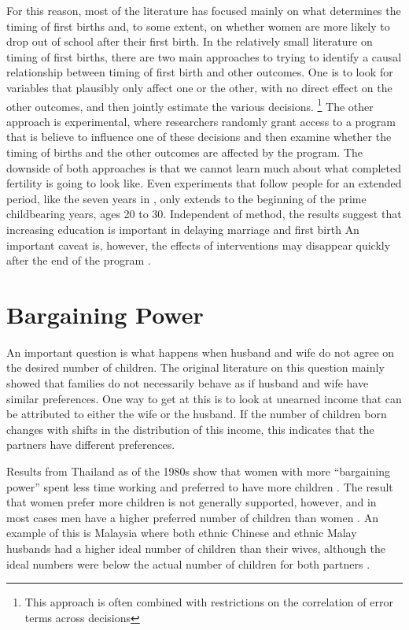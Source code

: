 \documentclass[letterpaper,12pt]{article}
\begin{document}
For this reason, most of the literature has focused mainly on what
determines the timing of first births and, to some extent, on whether
women are more likely to drop out of school after their first birth.
In the relatively small literature on timing of first births, there are
two main approaches to trying to identify a causal relationship between
timing of first birth and other outcomes.
One is to look for variables that plausibly only affect one or the
other, with no direct effect on the other outcomes, and then jointly
estimate the various decisions.%
\footnote{
This approach is often combined with restrictions on the correlation of
error terms across decisions} The other approach is experimental, where
researchers randomly grant access to a program that is believe to
influence one of these decisions and then examine whether the timing of
births and the other outcomes are affected by the program.
The downside of both approaches is that we cannot learn much about what
completed fertility is going to look like.
Even experiments that follow people for an extended period, like the
seven years in \citet{Duflo2015}, only extends to the beginning of the
prime childbearing years, ages 20 to 30.
Independent of method, the results suggest that increasing education is
important in delaying marriage and first birth
\citep{Duflo2015,Marchetta2016} An important caveat is, however, the
effects of interventions may disappear quickly after the end of the
program \citep{Baird2016}.

\section{Bargaining Power}

An important question is what happens when husband and wife do not agree
on the desired number of children.
The original literature on this question mainly showed that families do
not necessarily behave as if husband and wife have similar preferences.
One way to get at this is to look at unearned income that can be
attributed to either the wife or the husband.
If the number of children born changes with shifts in the distribution
of this income, this indicates that the partners have different
preferences.

Results from Thailand as of the 1980s show that women with more
``bargaining power'' spent less time working and preferred to have more
children \citep{Schultz1990}.
The result that women prefer more children is not generally supported,
however, and in most cases men have a higher preferred number of
children than women \citep{Westoff2010}.
An example of this is Malaysia where both ethnic Chinese and ethnic
Malay husbands had a higher ideal number of children than their wives,
although the ideal numbers were below the actual number of children for
both partners \citep{Rasul2008}.
\end{document}
